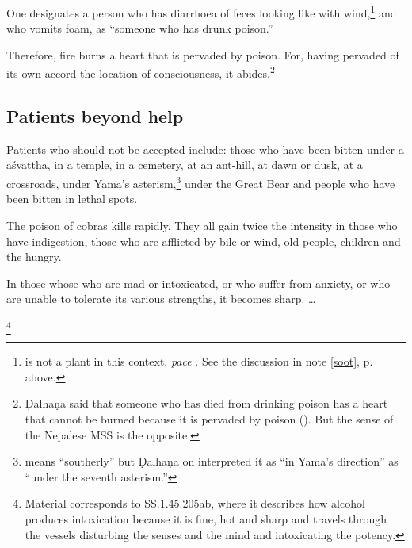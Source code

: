 \begin{translation}[resume]
One designates a person who has diarrhoea of feces looking like
 with wind,\footnote{ is not a plant
    in this context, \emph{pace} \cite[362]{moni-sans}. See the discussion
    in note \ref{soot}, p.\,\pageref{soot} above.\label{grhadhuma}} and who
    vomits foam, as “someone who has drunk poison.” \item[37]  Therefore,
    fire burns a  heart that is  pervaded by poison. For, having pervaded
    of its own accord  the location of consciousness, it
    abides.\footnote{Ḍalhaṇa said that someone who has died from drinking
        poison has a heart that cannot be burned because it is pervaded by
        poison (). But the sense of the Nepalese MSS is the
        opposite.}
 
 \subsection{Patients beyond help}  
 
 \item[38] 

Patients who should not be accepted include: those who have been
bitten under a \gls{aśvattha}, in a temple, in a cemetery, at an
ant-hill, at dawn or dusk, at a crossroads, under Yama's
asterism,\footnote{ means “southerly” but Ḍalhaṇa on
     interpreted it as “in
    Yama's direction” as “under the seventh asterism.”} under the Great
    Bear and people who have been bitten in lethal spots.
 
 \item[39]  
 
The poison of cobras kills rapidly.  They all gain twice the intensity
in those who have indigestion, those who are afflicted by bile or
wind, old people, children and the hungry.
 
 
 \item[39.1]  
 
In those whose who are mad or intoxicated, or who suffer from anxiety,
or who are unable to tolerate its various strengths, it becomes sharp.
\dag \ldots
 
 \item[39.2] 
 
 
 
 \footnote{Material corresponds to SS.1.45.205ab, where it  
 describes how alcohol produces intoxication because it is fine, hot  
 and sharp and travels through the vessels disturbing the senses and  
 the mind and intoxicating the potency.}  
 

\end{translation}
